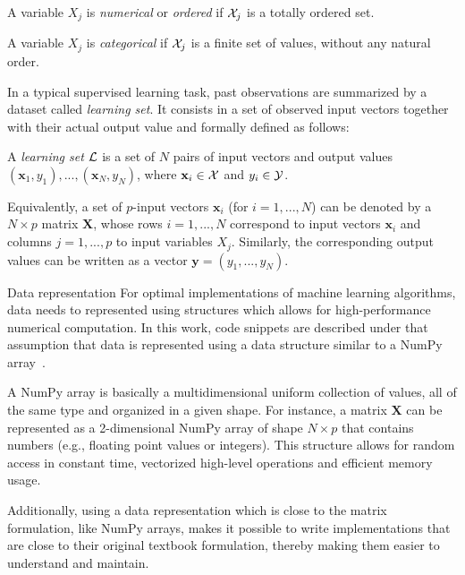 \begin{definition}
A variable $X_j$ is \emph{numerical} or \emph{ordered} if ${\cal X}_j$ is a
totally ordered set.
\end{definition}

\begin{definition}
A variable $X_j$ is \emph{categorical} if ${\cal X}_j$ is a finite set of values,
without any natural order.
\end{definition}

In a typical supervised learning task, past observations are summarized by a
dataset called {\it learning set}. It consists in a set of observed input
vectors together with their actual output value and formally defined as
follows:

\begin{definition}
A \emph{learning set} ${\cal L}$ is a set of $N$
pairs of input vectors and output values $(\mathbf{x}_1, y_1), ...,
(\mathbf{x}_N, y_N)$, where $\mathbf{x}_i \in {\cal X}$ and $y_i \in {\cal Y}$.
\end{definition}

Equivalently, a set of $p$-input vectors $\mathbf{x}_i$ (for $i=1, ..., N$) can
be denoted by a $N\times p$ matrix $\mathbf{X}$, whose rows $i=1, ..., N$
correspond to input vectors $\mathbf{x}_i$ and columns $j=1, ..., p$ to input
variables $X_j$. Similarly, the corresponding output values can be written as a
vector $\mathbf{y}=(y_1, ..., y_N)$.

\begin{remark}{Data representation}
For optimal implementations of machine learning algorithms, data needs to
represented using structures which allows for high-performance numerical
computation. In this work, code snippets are described under  that assumption
that data is represented using a data structure similar to a NumPy
array~\citep{vanderwalt:2011}.

A NumPy array is basically a multidimensional uniform collection of values, all
of the same type and organized in a given shape. For instance, a matrix
$\mathbf{X}$ can be represented as a 2-dimensional NumPy array of shape $N
\times p$ that contains numbers (e.g., floating point values or integers). This
structure allows for random access in constant time, vectorized high-level
operations and efficient memory usage.

Additionally, using a data representation which is close to the matrix
formulation, like NumPy arrays, makes it possible to write implementations that
are close to their original textbook formulation, thereby making them easier to
understand and maintain. \end{remark}


